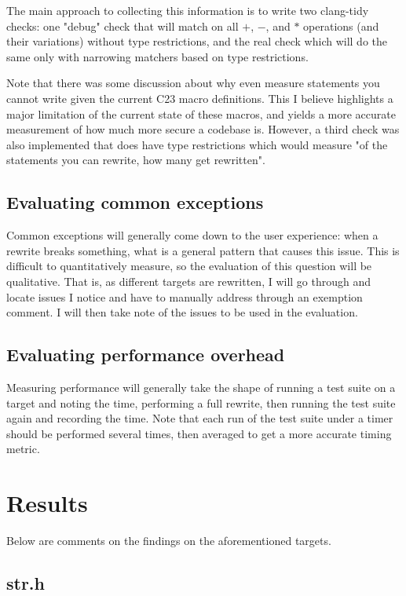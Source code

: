 The main approach to collecting this information is to write two clang-tidy checks: one "debug" check that will match on all $+$, $-$, and $*$ operations (and their variations) without type restrictions, and the real check which will do the same only with narrowing matchers based on type restrictions.

Note that there was some discussion about why even measure statements you cannot write given the current C23 macro definitions. This I believe highlights a major limitation of the current state of these macros, and yields a more accurate measurement of how much more secure a codebase is. However, a third check was also implemented that does have type restrictions which would measure "of the statements you can rewrite, how many get rewritten".

\subsection{Evaluating common exceptions}

Common exceptions will generally come down to the user experience: when a rewrite breaks something, what is a general pattern that causes this issue. This is difficult to quantitatively measure, so the evaluation of this question will be qualitative. That is, as different targets are rewritten, I will go through and locate issues I notice and have to manually address through an exemption comment. I will then take note of the issues to be used in the evaluation.

\subsection{Evaluating performance overhead}

Measuring performance will generally take the shape of running a test suite on a target and noting the time, performing a full rewrite, then running the test suite again and recording the time. Note that each run of the test suite under a timer should be performed several times, then averaged to get a more accurate timing metric.

\section{Results}

Below are comments on the findings on the aforementioned targets.

\subsection{str.h}


